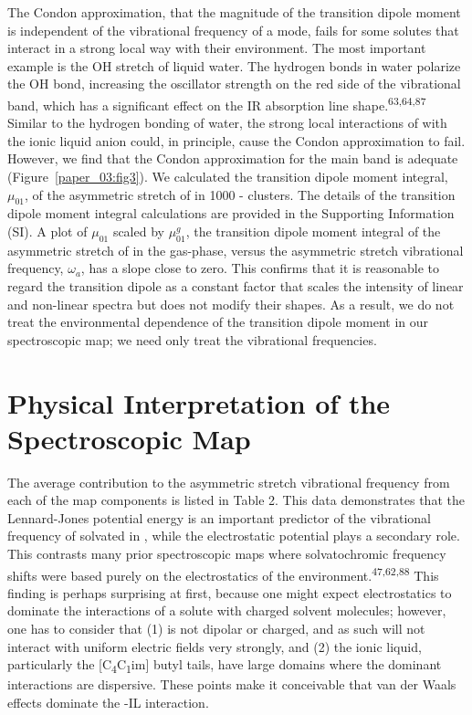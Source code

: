 \documentclass[]{article}
\begin{document}
The Condon approximation, that the magnitude of the transition dipole moment is independent of the vibrational frequency of a mode, fails for some solutes that interact in a strong local way with their environment.  The most important example is the OH stretch of liquid water. The hydrogen bonds in water polarize the OH bond, increasing the oscillator strength on the red side of the vibrational band, which has a significant effect on the IR absorption line shape.\textsuperscript{63,64,87} Similar to the hydrogen bonding of water, the strong local interactions of  with the ionic liquid anion could, in principle, cause the Condon approximation to fail. However, we find that the Condon approximation for the main band is adequate (Figure~\ref{paper_03:fig3}). We calculated the transition dipole moment integral, \(\mu_{01}\), of the asymmetric stretch of  in 1000 -\ce{[C4C1im][PF6]} clusters. The details of the transition dipole moment integral calculations are provided in the Supporting Information (SI). A plot of \(\mu_{01}\) scaled by \(\mu_{01}^{g}\), the transition dipole moment integral of the asymmetric stretch of  in the gas-phase, versus the asymmetric stretch vibrational frequency, \(\omega_{a}\), has a slope close to zero. This confirms that it is reasonable to regard the transition dipole as a constant factor that scales the intensity of linear and non-linear spectra but does not modify their shapes. As a result, we do not treat the environmental dependence of the transition dipole moment in our spectroscopic map; we need only treat the vibrational frequencies.

\section{Physical Interpretation of the Spectroscopic Map}
\label{paper_03:sec:IV}

The average contribution to the  asymmetric stretch vibrational frequency from each of the map components is listed in Table 2. This data demonstrates that the Lennard-Jones potential energy is an important predictor of the vibrational frequency of  solvated in \ce{[C4C1im][PF6]}, while the electrostatic potential plays a secondary role. This contrasts many prior spectroscopic maps where solvatochromic frequency shifts were based purely on the electrostatics of the environment.\textsuperscript{47,62,88} This finding is perhaps surprising at first, because one might expect electrostatics to dominate the interactions of a solute with charged solvent molecules; however, one has to consider that (1)  is not dipolar or charged, and as such will not interact with uniform electric fields very strongly, and (2) the ionic liquid, particularly the {[}C\textsubscript{4}C\textsubscript{1}im{]} butyl tails, have large domains where the dominant interactions are dispersive. These points make it conceivable that van der Waals effects dominate the -IL interaction.
\end{document}
